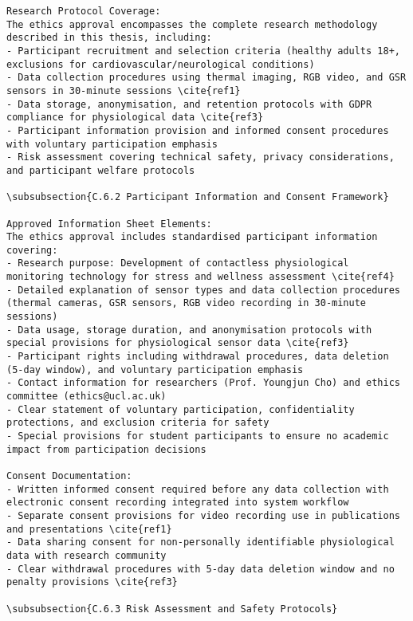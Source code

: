 \begin{verbatim}
Research Protocol Coverage:
The ethics approval encompasses the complete research methodology described in this thesis, including:
- Participant recruitment and selection criteria (healthy adults 18+, exclusions for cardiovascular/neurological conditions)
- Data collection procedures using thermal imaging, RGB video, and GSR sensors in 30-minute sessions \cite{ref1}
- Data storage, anonymisation, and retention protocols with GDPR compliance for physiological data \cite{ref3}
- Participant information provision and informed consent procedures with voluntary participation emphasis
- Risk assessment covering technical safety, privacy considerations, and participant welfare protocols

\subsubsection{C.6.2 Participant Information and Consent Framework}

Approved Information Sheet Elements:
The ethics approval includes standardised participant information covering:
- Research purpose: Development of contactless physiological monitoring technology for stress and wellness assessment \cite{ref4}
- Detailed explanation of sensor types and data collection procedures (thermal cameras, GSR sensors, RGB video recording in 30-minute sessions)
- Data usage, storage duration, and anonymisation protocols with special provisions for physiological sensor data \cite{ref3}
- Participant rights including withdrawal procedures, data deletion (5-day window), and voluntary participation emphasis
- Contact information for researchers (Prof. Youngjun Cho) and ethics committee (ethics@ucl.ac.uk)
- Clear statement of voluntary participation, confidentiality protections, and exclusion criteria for safety
- Special provisions for student participants to ensure no academic impact from participation decisions

Consent Documentation:
- Written informed consent required before any data collection with electronic consent recording integrated into system workflow
- Separate consent provisions for video recording use in publications and presentations \cite{ref1}
- Data sharing consent for non-personally identifiable physiological data with research community
- Clear withdrawal procedures with 5-day data deletion window and no penalty provisions \cite{ref3}

\subsubsection{C.6.3 Risk Assessment and Safety Protocols}


\end{verbatim}
